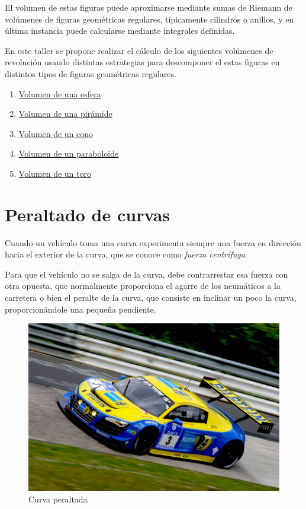 \documentclass[
  a4paper,
]{scrreport}
\begin{document}
El volumen de estas figuras puede aproximarse mediante sumas de Riemann
de volúmenes de figuras geométricas regulares, típicamente cilindros o
anillos, y en última instancia puede calcularse mediante integrales
definidas.

En este taller se propone realizar el cálculo de los siguientes
volúmenes de revolución usando distintas estrategias para descomponer el
estas figuras en distintos tipos de figuras geométricas regulares.

\begin{enumerate}
\def\labelenumi{\alph{enumi}.}
\item
  \href{https://www.geogebra.org/m/nfdm8xjg}{Volumen de una esfera}
\item
  \href{https://www.geogebra.org/m/g2wu3tqw}{Volumen de una pirámide}
\item
  \href{https://www.geogebra.org/m/vfqyfuxx}{Volumen de un cono}
\item
  \href{https://www.geogebra.org/m/xugkcvn5}{Volumen de un paraboloide}
\item
  \href{https://www.geogebra.org/m/wy2uquqc}{Volumen de un toro}
\end{enumerate}


\hypertarget{peraltado-de-curvas}{%
\chapter{Peraltado de curvas}\label{peraltado-de-curvas}}

Cuando un vehículo toma una curva experimenta siempre una fuerza en
dirección hacia el exterior de la curva, que se conoce como \emph{fuerza
centrífuga}.

Para que el vehículo no se salga de la curva, debe contrarrestar esa
fuerza con otra opuesta, que normalmente proporciona el agarre de los
neumáticos a la carretera o bien el peralte de la curva, que consiste en
inclinar un poco la curva, proporcionándole una pequeña pendiente.

\begin{figure}

{\centering \includegraphics{img/peraltado/peralte.jpeg}

}

\caption{Curva peraltada}

\end{figure}
\end{document}
